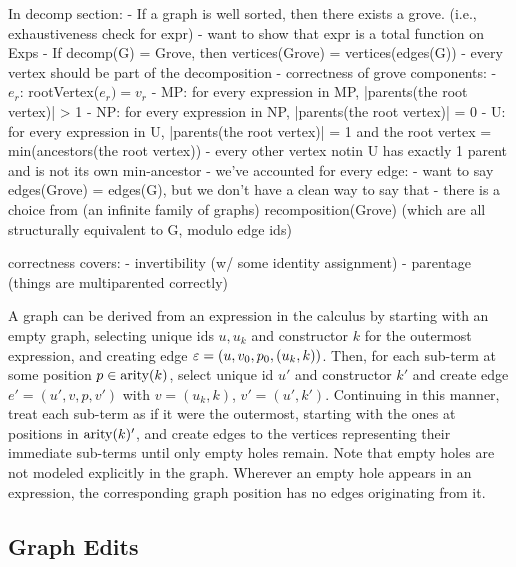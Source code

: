 

In decomp section:
- If a graph is well sorted, then there exists a grove. (i.e., exhaustiveness check for expr)
  - want to show that expr is a total function on Exps
- If decomp(G) = Grove, then vertices(Grove) = vertices(edges(G))
  - every vertex should be part of the decomposition
- correctness of grove components:
  - $e_r$: rootVertex($e_r) = v_r$
  - MP: for every expression in MP, |parents(the root vertex)| > 1
  - NP: for every expression in NP, |parents(the root vertex)| = 0
  - U: for every expression in U, |parents(the root vertex)| = 1 and the root vertex = min(ancestors(the root vertex))
    - every other vertex notin U has exactly 1 parent and is not its own min-ancestor
  - we've accounted for every edge:
    - want to say edges(Grove) = edges(G), but we don't have a clean way to say that
    - there is a choice from (an infinite family of graphs) recomposition(Grove) (which are all structurally equivalent to G, modulo edge ids)



correctness covers:
- invertibility (w/ some identity assignment)
- parentage (things are multiparented correctly)

\vspace*{\baselineskip}

A graph can be derived from an expression in the calculus by starting with an
empty graph, selecting unique ids $u, u_k$ and constructor $k$ for the outermost
expression, and creating edge $\varepsilon = (u, v_0, p_0, (u_k, k))$. Then, for each
sub-term at some position $p \in \operatorname{\text{arity}}\mathopen{}\left(k\right)\mathclose{}$, select unique id $u'$ and
constructor $k'$ and create edge $e' = (u', v, p, v')$ with $v = (u_k, k)$, $v'
= (u', k')$. Continuing in this manner, treat each sub-term as if it were the
outermost, starting with the ones at positions in $\operatorname{\text{arity}}\mathopen{}\left(k\right)\mathclose{}'$, and create edges
to the vertices representing their immediate sub-terms until only empty holes
remain. Note that empty holes are not modeled explicitly in the graph. Wherever
an empty hole appears in an expression, the corresponding graph position has no
edges originating from it.


\subsection{Graph Edits}%
\label{sub:Graph Edits}

